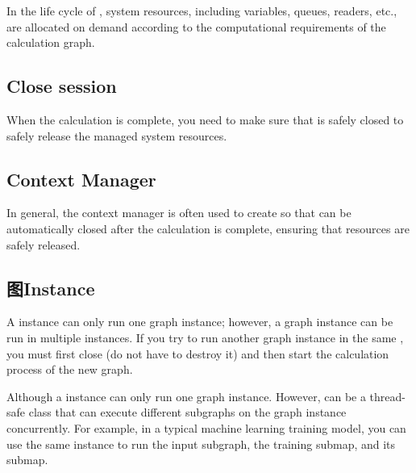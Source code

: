 \begin{content}

In the life cycle of , system resources, including variables, queues, readers, etc., are allocated on demand according to the computational requirements of the calculation graph.

\subsection{Close session}

When the calculation is complete, you need to make sure that  is safely closed to safely release the managed system resources.


\subsection{Context Manager}

In general, the context manager is often used to create  so that  can be automatically closed after the calculation is complete, ensuring that resources are safely released.


\subsection{图Instance}

A  instance can only run one graph instance; however, a graph instance can be run in multiple  instances. If you try to run another graph instance in the same , you must first close  (do not have to destroy it) and then start the calculation process of the new graph.

Although a  instance can only run one graph instance. However,  can be a thread-safe class that can execute different subgraphs on the graph instance concurrently. For example, in a typical machine learning training model, you can use the same  instance to run the input subgraph, the training submap, and its  submap.


\end{content}
